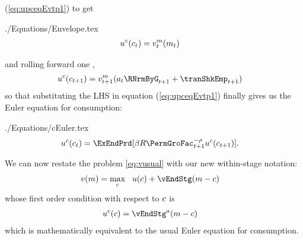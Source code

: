 \documentclass[SolvingMicroDSOPs]{subfiles}
\begin{document}
(\ref{eq:upceqEvtp1}) to get
\begin{verbatimwrite}{./Equations/Envelope.tex}
  \begin{equation}\begin{gathered}\begin{aligned}
        u^{c}(c_{t})  & = {v}^{m}_{t}(m_{t})\label{eq:upcteqvtp}
      \end{aligned}\end{gathered}\end{equation}
\end{verbatimwrite}
\unskip
and rolling forward one {\interval},
\begin{equation}\begin{gathered}\begin{aligned}
      \uFunc^{\cNrm}(\cNrm_{\prd+1})  & = \vFunc^{\mNrm}_{\prd+1}({a}_{\prd}\RNrmByG_{\prd+1}+\tranShkEmp_{\prd+1}) \label{eq:upctp1EqVpxtp1}
    \end{aligned}\end{gathered}\end{equation}
so that substituting the LHS in equation (\ref{eq:upceqEvtp1}) finally gives us the Euler equation for consumption:
\begin{verbatimwrite}{./Equations/cEuler.tex}
  \begin{equation}\begin{gathered}\begin{aligned}
        \uFunc^{\cNrm}(\cNrm_{\prd})  & = \ExEndPrd[\DiscFac \Rfree \PermGroFac_{\prd+1}^{-\CRRA}\uFunc^{\cNrm}(\cNrm_{\prd+1})] \label{eq:cEuler}.
      \end{aligned}\end{gathered}\end{equation}
\end{verbatimwrite}
\unskip

We can now restate the problem \eqref{eq:vusual} with our new within-stage notation:
\begin{equation}\begin{gathered}\begin{aligned}
      \vFunc(m) & = \max_{\cNrm} ~~ \uFunc(\cNrm)+ \vEndStg(\mNrm-\cNrm)
\end{aligned}\end{gathered}\end{equation}
whose first order condition with respect to $c$ is
\begin{equation}\begin{gathered}\begin{aligned}
  \uFunc^{\cNrm}(\cNrm) &= \vEndStg^{\aNrm}(\mNrm-\cNrm)  \label{eq:upEqbetaOp} %
\end{aligned}\end{gathered}\end{equation}
which is mathematically equivalent to the usual Euler equation for consumption.
\end{document}
